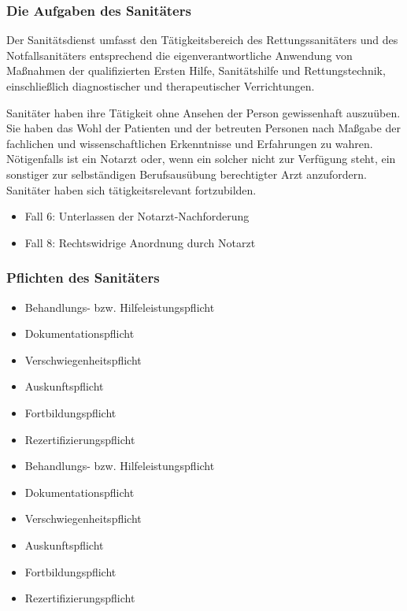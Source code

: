 \subsubsection{Die Aufgaben des Sanitäters}

\Text
{{\TxBeschreibung}}%
{%
Der Sanitätsdienst umfasst den Tätigkeitsbereich des
Rettungssanitäters und des Notfallsanitäters entsprechend
die eigenverantwortliche Anwendung von Maßnahmen der 
qualifizierten Ersten Hilfe, Sanitätshilfe und 
Rettungstechnik, einschließlich diagnostischer und
therapeutischer Verrichtungen.

Sanitäter haben ihre Tätigkeit ohne Ansehen der
Person gewissenhaft auszuüben. Sie haben das Wohl der
Patienten und der betreuten Personen nach Maßgabe der
fachlichen und wissenschaftlichen Erkenntnisse und
Erfahrungen zu wahren. Nötigenfalls ist ein Notarzt oder,
wenn ein solcher nicht zur Verfügung steht, ein sonstiger
zur selbständigen Berufsausübung berechtigter Arzt
anzufordern. Sanitäter haben sich tätigkeitsrelevant
fortzubilden. 
}%



{
\begin{itemize}
  \item Fall 6: Unterlassen der Notarzt-Nachforderung
  \dotfill{}
  \item Fall 8: Rechtswidrige Anordnung durch Notarzt
  \dotfill{}
\end{itemize}
}
{}
{}
{}
{}

\subsubsection{Pflichten des Sanitäters}
\label{topic:sanitaeter-pflichten}

\Text
{{\TxBeschreibung}}%
{%
\begin{itemize}
  \item Behandlungs- bzw. Hilfeleistungspflicht  
  \item Dokumentationspflicht
  \item Verschwiegenheitspflicht
  \item Auskunftspflicht
  \item Fortbildungspflicht
  \item Rezertifizierungspflicht
\end{itemize}
}%
{%
\begin{itemize}
  \item Behandlungs- bzw. Hilfeleistungspflicht  
  \item Dokumentationspflicht
  \item Verschwiegenheitspflicht
  \item Auskunftspflicht
  \item Fortbildungspflicht
  \item Rezertifizierungspflicht
\end{itemize}
}

